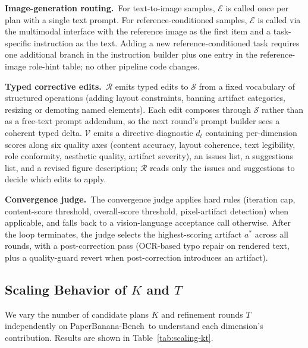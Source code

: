\documentclass{article}
\newcommand{\PaperBananaBench}{PaperBanana-Bench\xspace}
\begin{document}
\noindent\textbf{Image-generation routing.}\
For text-to-image samples, $\mathcal{E}$ is called once per plan \citep{si2023spokenwoz, si2026goalplanjustwish} with a single text prompt. For reference-conditioned samples, $\mathcal{E}$ is called via the multimodal interface with the reference image as the first item and a task-specific instruction as the text. Adding a new reference-conditioned task requires one additional branch in the instruction builder plus one entry in the reference-image role-hint table; no other pipeline code changes.

\noindent\textbf{Typed corrective edits.}\
$\mathcal{R}$ emits typed edits to $\mathcal{S}$ from a fixed vocabulary of structured operations (adding layout constraints, banning artifact categories, resizing or demoting named elements). Each edit composes through $\mathcal{S}$ rather than as a free-text prompt addendum, so the next round's prompt builder sees a coherent typed delta. $\mathcal{V}$ emits a directive diagnostic $d_t$ containing per-dimension scores along six quality axes (content accuracy, layout coherence, text legibility, role conformity, aesthetic quality, artifact severity), an issues list, a suggestions list, and a revised figure description; $\mathcal{R}$ reads only the issues and suggestions to decide which edits to apply.

\noindent\textbf{Convergence judge.}\
The convergence judge applies hard rules (iteration cap, content-score threshold, overall-score threshold, pixel-artifact detection) when applicable, and falls back to a vision-language acceptance call otherwise. After the loop terminates, the judge selects the highest-scoring artifact $a^*$ across all rounds, with a post-correction pass (OCR-based typo repair on rendered text, plus a quality-guard revert when post-correction introduces an artifact).

\subsection{Scaling Behavior of $K$ and $T$}
\label{app:scaling}

We vary the number of candidate plans $K$ and refinement rounds $T$ independently on \PaperBananaBench\ to understand each dimension's contribution. Results are shown in Table~\ref{tab:scaling-kt}.
\end{document}
